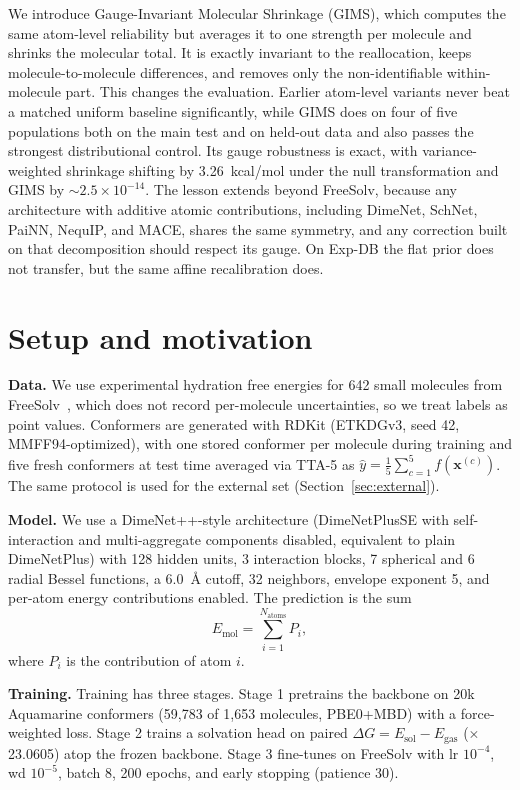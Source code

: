 \documentclass{article}
\begin{document}
We introduce Gauge-Invariant Molecular Shrinkage (GIMS), which computes the
same atom-level reliability but averages it to one strength per molecule and
shrinks the molecular total. It is exactly invariant to the reallocation,
keeps molecule-to-molecule differences, and removes only the non-identifiable
within-molecule part. This changes the evaluation. Earlier atom-level variants
never beat a matched uniform baseline significantly, while GIMS does on four
of five populations both on the main test and on held-out data and also passes
the strongest distributional control. Its gauge robustness is exact, with
variance-weighted shrinkage shifting by 3.26~kcal/mol under the null
transformation and GIMS by $\sim2.5\times10^{-14}$. The lesson extends beyond
FreeSolv, because any architecture with additive atomic contributions,
including DimeNet, SchNet, PaiNN, NequIP, and MACE, shares the same symmetry,
and any correction built on that decomposition should respect its gauge. On
Exp-DB the flat prior does not transfer, but the same affine recalibration
does.

\section{Setup and motivation}
\label{sec:setup}

\textbf{Data.} We use experimental hydration free energies for 642 small
molecules from FreeSolv~\cite{mobley2014freesolv}, which does not record
per-molecule uncertainties, so we treat labels as point values. Conformers are
generated with RDKit (ETKDGv3, seed 42, MMFF94-optimized), with one stored
conformer per molecule during training and five fresh conformers at test time
averaged via TTA-5 as $\hat{y} = \frac{1}{5}\sum_{c=1}^{5}
f(\mathbf{x}^{(c)})$. The same protocol is used for the external set
(Section~\ref{sec:external}).

\textbf{Model.} We use a DimeNet++-style architecture (DimeNetPlusSE with
self-interaction and multi-aggregate components disabled, equivalent to plain
DimeNetPlus) with 128 hidden units, 3 interaction blocks, 7 spherical and 6
radial Bessel functions, a 6.0~\AA{} cutoff, 32 neighbors, envelope exponent 5,
and per-atom energy contributions enabled. The prediction is the sum
\[
E_{\mathrm{mol}} = \sum_{i=1}^{N_{\mathrm{atoms}}} P_i ,
\]
where $P_i$ is the contribution of atom $i$.

\textbf{Training.} Training has three stages. Stage 1 pretrains the backbone on
20k Aquamarine conformers (59{,}783 of 1{,}653 molecules, PBE0+MBD) with a
force-weighted loss. Stage 2 trains a solvation head on paired
$\Delta G=E_{\mathrm{sol}}-E_{\mathrm{gas}}$ ($\times$23.0605) atop the
frozen backbone. Stage 3 fine-tunes on FreeSolv with lr $10^{-4}$, wd
$10^{-5}$, batch 8, 200 epochs, and early stopping (patience 30).
\end{document}
